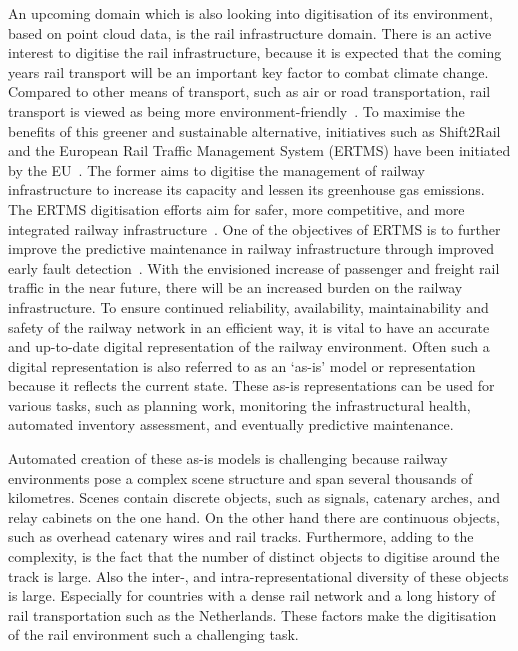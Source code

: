An upcoming domain which is also looking into digitisation of its environment, based on point cloud data, is the rail infrastructure domain. There is an active interest to digitise the rail infrastructure, because it is expected that the coming years rail transport will be an important key factor to combat climate change. Compared to other means of transport, such as air or road transportation, rail transport is viewed as being more environment-friendly~\cite{eu_railway_2020_Fostering}. To maximise the benefits of this greener and sustainable alternative, initiatives such as Shift2Rail and the European Rail Traffic Management System (ERTMS) have been initiated by the EU~\cite{shift2rail,eu_railway_2020_Fostering}. The former aims to digitise the management of railway infrastructure to increase its capacity and lessen its greenhouse gas emissions. The ERTMS digitisation efforts aim for safer, more competitive, and more integrated railway infrastructure~\cites[23]{eu_railway_2020_Fostering}[]{ruete_2020_ERTMS}. One of the objectives of ERTMS is to further improve the predictive maintenance in railway infrastructure through improved early fault detection~\cite{eu_railway_2020_Fostering}. With the envisioned increase of passenger and freight rail traffic in the near future, there will be an increased burden on the railway infrastructure. To ensure continued reliability, availability, maintainability and safety of the railway network in an efficient way, it is vital to have an accurate and up-to-date digital representation of the railway environment. Often such a digital representation is also referred to as an `as-is' model or representation because it reflects the current state. These as-is representations can be used for various tasks, such as planning work, monitoring the infrastructural health, automated inventory assessment, and eventually predictive maintenance. 

Automated creation of these as-is models is challenging because railway environments pose a complex scene structure and span several thousands of kilometres. Scenes contain discrete objects, such as signals, catenary arches, and relay cabinets on the one hand. On the other hand there are continuous objects, such as overhead catenary wires and rail tracks. Furthermore, adding to the complexity, is the fact that the number of distinct objects to digitise around the track is large. Also the inter-, and intra-representational diversity of these objects is large. Especially for countries with a dense rail network and a long history of rail transportation such as the Netherlands. These factors make the digitisation of the rail environment such a challenging task.

